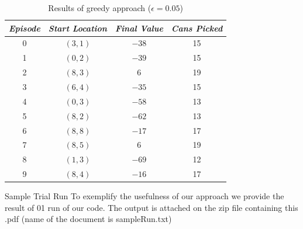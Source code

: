 \documentclass[conference]{IEEEtran}
\makeatletter
\renewcommand\section{\@startsection{section}{1}{\z@}
                                  {-3.0ex plus -1.5ex minus -0.5ex}
                                  {0.7ex plus 1ex minus 0ex}
                                  {\bfseries}}
\makeatother
\begin{document}
\begin{table}[h]
\centering
\caption{Results of greedy approach ($\epsilon=0.05$)}
\begin{tabular}{|c|c|c|c|}
\hline 
\textit{ \textbf{Episode}} & \textit{ \textbf{Start Location}} & \textit{ \textbf{Final Value}} &  \textit{ \textbf{Cans Picked}}\\
\hline 
0 & $(3,1)$ & $-38$ & 15 \\
1 & $(0,2)$ & $-39$ & 15 \\
2 & $(8,3)$ & $6$ & 19 \\
3 & $(6,4)$ & $-35$ & 15 \\
4 & $(0,3)$ & $-58$ & 13 \\
5 & $(8,2)$ & $-62$ & 13 \\
6 & $(8,8)$ & $-17$ & 17 \\
7 & $(8,5)$ & $6$ & 19 \\
8 & $(1,3)$ & $-69$ & 12 \\ 
9 & $(8,4)$ & $-16$ & 17 \\ 
\hline
\end{tabular}
\label{tab:greedy}
\end{table} 

\section{Sample Trial Run}
To exemplify the usefulness of our approach we provide the result of 01
run of our code. The output is attached on the zip file containing
this .pdf (name of the document is sampleRun.txt)
\end{document}
